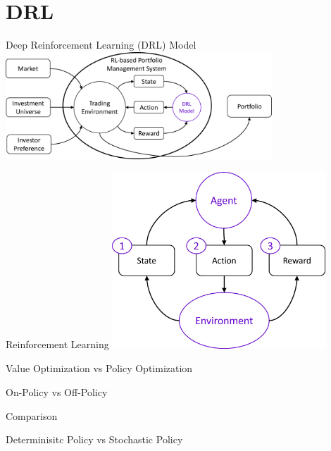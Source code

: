 \section{DRL}
\begin{frame}{Deep Reinforcement Learning (DRL) Model}
    \centering
    \includegraphics[width=10cm]{images/drl_model.png}
\end{frame}

\begin{frame}{Reinforcement Learning}
    \centering
    \includegraphics[width=8cm]{images/rl_overview.png}
\end{frame}



\begin{frame}{Value Optimization vs Policy Optimization}
\end{frame}

\begin{frame}{On-Policy vs Off-Policy}
\end{frame}

\begin{frame}{Comparison}
\end{frame}


\begin{frame}{Determinisitc Policy vs Stochastic Policy}
\end{frame}

